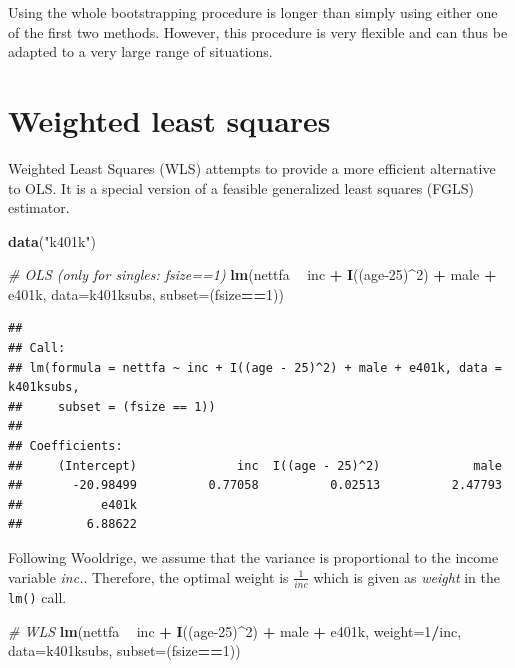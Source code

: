 \documentclass[]{book}
\newenvironment{Shaded}{\begin{snugshade}}{\end{snugshade}}
\newcommand{\CommentTok}[1]{\textcolor[rgb]{0.56,0.35,0.01}{\textit{#1}}}
\newcommand{\DataTypeTok}[1]{\textcolor[rgb]{0.13,0.29,0.53}{#1}}
\newcommand{\DecValTok}[1]{\textcolor[rgb]{0.00,0.00,0.81}{#1}}
\newcommand{\KeywordTok}[1]{\textcolor[rgb]{0.13,0.29,0.53}{\textbf{#1}}}
\newcommand{\NormalTok}[1]{#1}
\newcommand{\OperatorTok}[1]{\textcolor[rgb]{0.81,0.36,0.00}{\textbf{#1}}}
\newcommand{\StringTok}[1]{\textcolor[rgb]{0.31,0.60,0.02}{#1}}
\begin{document}
Using the whole bootstrapping procedure is longer than simply using either one of the first two methods. However, this procedure is very flexible and can thus be adapted to a very large range of situations.

\hypertarget{weighted-least-squares}{%
\section{Weighted least squares}\label{weighted-least-squares}}

Weighted Least Squares (WLS) attempts to provide a more efficient alternative to OLS. It is a special version of a feasible generalized least squares (FGLS) estimator.

\begin{Shaded}
\begin{Highlighting}[]
\KeywordTok{data}\NormalTok{(}\StringTok{"k401k"}\NormalTok{)}
\end{Highlighting}
\end{Shaded}

\begin{Shaded}
\begin{Highlighting}[]
\CommentTok{# OLS (only for singles: fsize==1)}
\KeywordTok{lm}\NormalTok{(nettfa }\OperatorTok{~}\StringTok{ }\NormalTok{inc }\OperatorTok{+}\StringTok{ }\KeywordTok{I}\NormalTok{((age}\DecValTok{-25}\NormalTok{)}\OperatorTok{^}\DecValTok{2}\NormalTok{) }\OperatorTok{+}\StringTok{ }\NormalTok{male }\OperatorTok{+}\StringTok{ }\NormalTok{e401k, }
   \DataTypeTok{data=}\NormalTok{k401ksubs, }\DataTypeTok{subset=}\NormalTok{(fsize}\OperatorTok{==}\DecValTok{1}\NormalTok{))}
\end{Highlighting}
\end{Shaded}

\begin{verbatim}
## 
## Call:
## lm(formula = nettfa ~ inc + I((age - 25)^2) + male + e401k, data = k401ksubs, 
##     subset = (fsize == 1))
## 
## Coefficients:
##     (Intercept)              inc  I((age - 25)^2)             male  
##       -20.98499          0.77058          0.02513          2.47793  
##           e401k  
##         6.88622
\end{verbatim}

Following Wooldrige, we assume that the variance is proportional to the income variable \emph{inc.}. Therefore, the optimal weight is \(\frac{1}{inc}\) which is given as \emph{weight} in the \texttt{lm()} call.

\begin{Shaded}
\begin{Highlighting}[]
\CommentTok{# WLS}
\KeywordTok{lm}\NormalTok{(nettfa }\OperatorTok{~}\StringTok{ }\NormalTok{inc }\OperatorTok{+}\StringTok{ }\KeywordTok{I}\NormalTok{((age}\DecValTok{-25}\NormalTok{)}\OperatorTok{^}\DecValTok{2}\NormalTok{) }\OperatorTok{+}\StringTok{ }\NormalTok{male }\OperatorTok{+}\StringTok{ }\NormalTok{e401k, }\DataTypeTok{weight=}\DecValTok{1}\OperatorTok{/}\NormalTok{inc, }
   \DataTypeTok{data=}\NormalTok{k401ksubs, }\DataTypeTok{subset=}\NormalTok{(fsize}\OperatorTok{==}\DecValTok{1}\NormalTok{))}
\end{Highlighting}
\end{Shaded}
\end{document}
